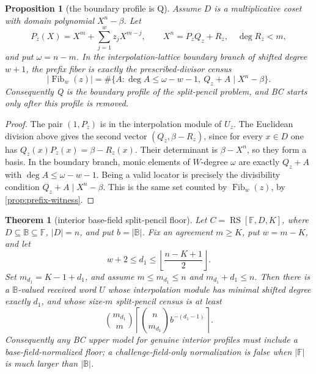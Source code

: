 \documentclass[a4paper,11pt]{amsart}
\newtheorem{theorem}{Theorem}[section]
\newtheorem{proposition}[proposition]{Proposition}
\theoremstyle{remark}
\newcommand{\F}{\mathbb F}
\newcommand{\B}{\mathbb B}
\newcommand{\RS}{\operatorname{RS}}
\newcommand{\Fib}{\operatorname{Fib}}
\begin{document}
\begin{proposition}[the boundary profile is Q]\label{prop:boundary-q}
Assume \(D\) is a multiplicative coset with domain polynomial \(X^n-\beta\).  Let
\[
        P_z(X)=X^m+\sum_{j=1}^w z_jX^{m-j},\qquad
        X^n=P_zQ_z+R_z,\quad \deg R_z<m,
\]
and put \(\omega=n-m\).  In the interpolation-lattice boundary branch of shifted degree \(w+1\), the prefix fiber is exactly the prescribed-divisor census
\[
        |\Fib_w(z)|
        =
        \#\{A:\deg A\le\omega-w-1,\ Q_z+A\mid X^n-\beta\}.
\]
Consequently Q is the boundary profile of the split-pencil problem, and BC starts only after this profile is removed.
\end{proposition}

\begin{proof}
The pair \((1,P_z)\) is in the interpolation module of \(U_z\).  The Euclidean division above gives the second vector \((Q_z,\beta-R_z)\), since for every \(x\in D\) one has \(Q_z(x)P_z(x)=\beta-R_z(x)\).  Their determinant is \(\beta-X^n\), so they form a basis.  In the boundary branch, monic elements of \(W\)-degree \(\omega\) are exactly \(Q_z+A\) with \(\deg A\le\omega-w-1\).  Being a valid locator is precisely the divisibility condition \(Q_z+A\mid X^n-\beta\).  This is the same set counted by \(\Fib_w(z)\), by \cref{prop:prefix-witness}.
\end{proof}

\begin{theorem}[interior base-field split-pencil floor]\label{prop:base-field-floor}
Let \(C=\RS[\F,D,K]\), where \(D\subseteq\B\subseteq\F\), \(|D|=n\), and put \(b=|\B|\).  Fix an agreement \(m\ge K\), put \(w=m-K\), and let
\[
        w+2\le d_1\le \left\lfloor \frac{n-K+1}{2}\right\rfloor .
\]
Set \(m_{d_1}=K-1+d_1\), and assume \(m\le m_{d_1}\le n\) and \(m_{d_1}+d_1\le n\).  Then there is a \(\B\)-valued received word \(U\) whose interpolation module has minimal shifted degree exactly \(d_1\), and whose size-\(m\) split-pencil census is at least
\[
        \binom{m_{d_1}}{m}
        \left\lceil\binom{n}{m_{d_1}}b^{-(d_1-1)}\right\rceil .
\]
Consequently any BC upper model for genuine interior profiles must include a base-field-normalized floor; a challenge-field-only normalization is false when \(|\F|\) is much larger than \(|\B|\).
\end{theorem}
\end{document}
